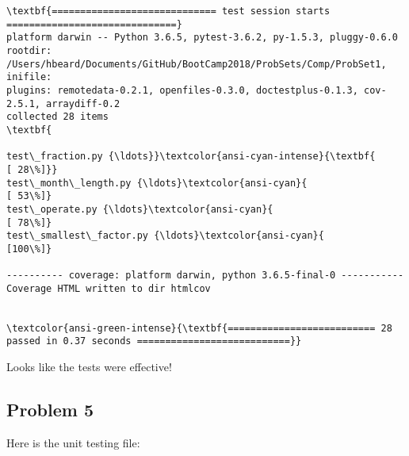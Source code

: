 \documentclass[11pt]{article}
\begin{document}
    \begin{Verbatim}[commandchars=\\\{\}]
\textbf{============================= test session starts ==============================}
platform darwin -- Python 3.6.5, pytest-3.6.2, py-1.5.3, pluggy-0.6.0
rootdir: /Users/hbeard/Documents/GitHub/BootCamp2018/ProbSets/Comp/ProbSet1, inifile:
plugins: remotedata-0.2.1, openfiles-0.3.0, doctestplus-0.1.3, cov-2.5.1, arraydiff-0.2
collected 28 items                                                             \textbf{

test\_fraction.py {\ldots}}\textcolor{ansi-cyan-intense}{\textbf{                                                [ 28\%]}}
test\_month\_length.py {\ldots}\textcolor{ansi-cyan}{                                             [ 53\%]}
test\_operate.py {\ldots}\textcolor{ansi-cyan}{                                                  [ 78\%]}
test\_smallest\_factor.py {\ldots}\textcolor{ansi-cyan}{                                           [100\%]}

---------- coverage: platform darwin, python 3.6.5-final-0 -----------
Coverage HTML written to dir htmlcov


\textcolor{ansi-green-intense}{\textbf{========================== 28 passed in 0.37 seconds ===========================}}

    \end{Verbatim}

    Looks like the tests were effective!

    \subsection*{Problem 5}\label{problem-5}

    Here is the unit testing file:
\end{document}
